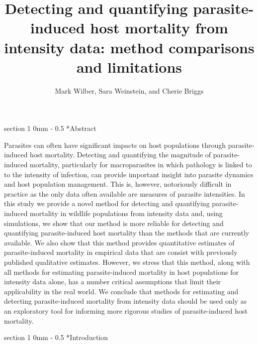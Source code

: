 \documentclass[12pt, a4paper]{article}
\title{Detecting and quantifying parasite-induced host mortality from intensity data: method comparisons and limitations}
\author{Mark Wilber, Sara Weinstein, and Cherie Briggs}
\makeatletter
\renewcommand{\section}{\@startsection
{section}%
{1}%
{0mm}%
{-\baselineskip}%
{0.5\baselineskip}%
{\normalfont\bf\large}} %
\makeatother
\begin{document}
\maketitle

\section*{Abstract}

Parasites can often have significant impacts on host populations through parasite-induced host mortality.  Detecting and quantifying the magnitude of parasite-
induced mortality, particularly for macroparasites in which pathology is
linked to to the intensity of infection, can provide important insight into
parasite dynamics and host population management. This is, however,
notoriously difficult in practice as the only data often available are measures of parasite intensities. In this study we provide a novel method for detecting and
quantifying parasite-induced mortality in wildlife populations from intensity
data and, using simulations, we show that our method is more reliable for
detecting and quantifying parasite-induced host mortality than the methods that are
currently available.  We also show that this method provides quantitative
estimates of parasite-induced mortality in empirical data that are consist
with previously published qualitative estimates. However, we stress that this
method, along with all methods for estimating parasite-induced mortality in
host populations for intensity data alone, has a number critical assumptions that limit their
applicability in the real world.  We conclude that methods for estimating and
detecting parasite-induced mortality from intensity data should be used only as an
exploratory tool for informing more rigorous studies of parasite-induced host
mortality.

\doublespacing

\linenumbers
\section*{Introduction}
\end{document}
